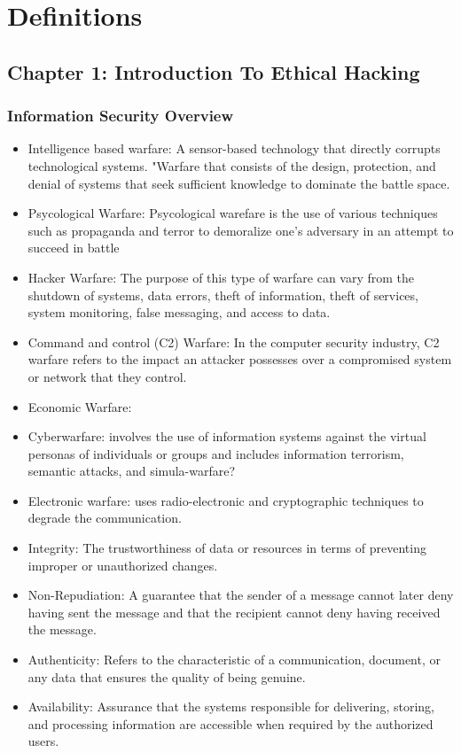\section{Definitions}

\subsection{Chapter 1: Introduction To Ethical Hacking}
\subsubsection{Information Security Overview}
\begin{itemize}
    \item Intelligence based warfare: A sensor-based technology that directly corrupts technological systems. "Warfare that consists of the design, protection, and denial of systems that seek sufficient knowledge to dominate the battle space.
    \item Psycological Warfare: Psycological warefare is the use of various techniques such as propaganda and terror to demoralize one's adversary in an attempt to succeed in battle
    \item Hacker Warfare: The purpose of this type of warfare can vary from the shutdown of systems, data errors, theft of information, theft of services, system monitoring, false messaging, and access to data.
    \item Command and control (C2) Warfare: In the computer security industry, C2 warfare refers to the impact an attacker possesses over a compromised system or network that they control.
    \item Economic Warfare: 
    \item Cyberwarfare: involves the use of information systems against the virtual personas of individuals or groups and includes information terrorism, semantic attacks, and simula-warfare?
    \item Electronic warfare: uses radio-electronic and cryptographic techniques to degrade the communication.
    \item Integrity: The trustworthiness of data or resources in terms of preventing improper or unauthorized changes.
    \item Non-Repudiation: A guarantee that the sender of a message cannot later deny having sent the message and that the recipient cannot deny having received the message.
    \item Authenticity: Refers to the characteristic of a communication, document, or any data that ensures the quality of being genuine.
    \item Availability: Assurance that the systems responsible for delivering, storing, and processing information are accessible when required by the authorized users.
\end{itemize}
